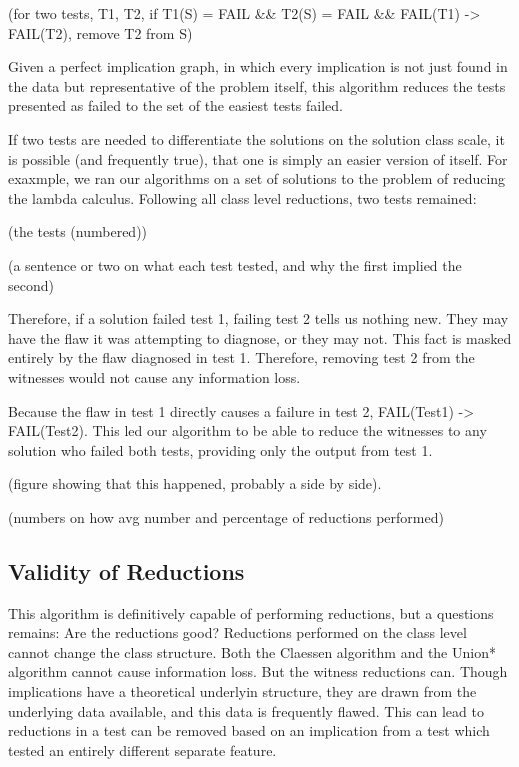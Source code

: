 \documentclass[11pt]{article}
\begin{document}
(for two tests, T1, T2, if T1(S) = FAIL \&\& T2(S) = FAIL \&\& FAIL(T1) -> FAIL(T2), remove T2 from S)

Given a perfect implication graph, in which every implication is not just found in the data but representative of the problem itself, this algorithm reduces the tests presented as  failed to the set of the easiest tests failed. 

If two tests are needed to differentiate the solutions on the solution class scale, it is possible (and frequently true), that one is simply an easier version of itself. For exaxmple, we ran our algorithms on a set of solutions to the problem of reducing the lambda calculus. Following all class level reductions, two tests remained:

(the tests (numbered))

(a sentence or two on what each test tested,  and why the first implied the second)

Therefore, if a solution failed test 1, failing test 2 tells us nothing new. They may have the flaw it was attempting to diagnose, or they may not. This fact is masked entirely by the flaw diagnosed in test 1. Therefore, removing test 2 from the witnesses would not cause any information loss.

Because the flaw in test 1 directly causes a failure in test 2, FAIL(Test1) -> FAIL(Test2). This led our algorithm to be able to reduce the witnesses to any solution who failed both tests, providing only the output from test 1.

(figure showing that this happened, probably a side by side).

(numbers on how avg number and percentage of reductions performed)

\subsection{Validity of Reductions}

This algorithm is definitively  capable of performing reductions, but a questions remains: Are the reductions good? Reductions performed on the class level cannot change the class structure. Both the Claessen algorithm and the Union* algorithm cannot cause information loss. But the witness reductions can. Though implications have a theoretical underlyin structure, they are drawn from the underlying data available, and this data is frequently flawed. This can lead to reductions in a test can be removed based on an implication from a test which tested an entirely different separate feature.
\end{document}
